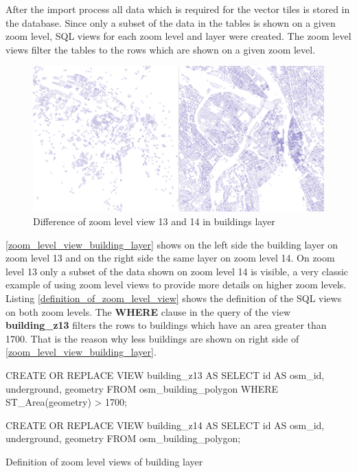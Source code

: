 After the import process all \osm{} data which is required for the vector tiles is stored in the database. Since only a subset of the data in the tables is shown on a given zoom level, SQL views for each zoom level and layer were created. The zoom level views filter the tables to the rows which are shown on a given zoom level.

\begin{figure}[H]
  \centering
  \includegraphics[width=\textwidth]{images/buildings_z13_z14}
  \caption{Difference of zoom level view 13 and 14 in buildings layer}
  \label{zoom_level_view_building_layer}
\end{figure}

\autoref{zoom_level_view_building_layer} shows on the left side the building layer on zoom level 13 and on the right side the same layer on zoom level 14. On zoom level 13 only a subset of the data shown on zoom level 14 is visible, a very classic example of using zoom level views to provide more details on higher zoom levels.
\\
Listing \autoref{definition_of_zoom_level_view} shows the definition of the SQL views on both zoom levels. The \textbf{WHERE} clause in the query of the view \textbf{building\_z13} filters the rows to buildings which have an area greater than 1700. That is the reason why less buildings are shown on right side of \autoref{zoom_level_view_building_layer}.

\begin{listing}[H]
\begin{sqlcode}
CREATE OR REPLACE VIEW building_z13 AS
    SELECT id AS osm_id, underground, geometry
    FROM osm_building_polygon
    WHERE ST_Area(geometry) > 1700;

CREATE OR REPLACE VIEW building_z14 AS
    SELECT id AS osm_id, underground, geometry
    FROM osm_building_polygon;
\end{sqlcode}
\caption{Definition of zoom level views of building layer}
\label{definition_of_zoom_level_view}
\end{listing}

